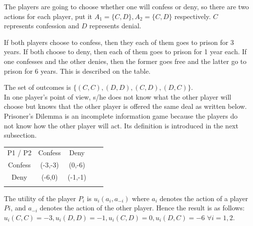 \documentclass[11pt]{article}
\begin{document}
	The players are going to choose whether one will confess or deny, so there are two actions for each player, put it $A_1=\{C,D\}, A_2=\{C,D\}$ respectively. $C$ represents confession and $D$ represents denial.
	
	If both players choose to confess, then they each of them goes to prison for 3 years. If both choose to deny, then each of them goes to prison for 1 year each. If one confesses and the other denies, then the former goes free and the latter go to prison for 6 years. This is described on the table.
	
	The set of outcomes is $\{(C,C), (D,D), (C,D), (D,C)\}$.\\In one player's point of view, s/he does not know what the other player will choose but knows that the other player is offered the same deal as written below. Prisoner's Dilemma is an incomplete information game because the players do not know how the other player will act. Its definition is introduced in the next subsection.

\begin{center}
\begin{tabular}{cccll}
\cline{1-3}
\multicolumn{1}{|c|}{P1 / P2} & \multicolumn{1}{c|}{Confess} & \multicolumn{1}{c|}{Deny}    &  &  \\ \cline{1-3}
\multicolumn{1}{|c|}{Confess} & \multicolumn{1}{c|}{(-3,-3)} & \multicolumn{1}{c|}{(0,-6)}  &  &  \\ \cline{1-3}
\multicolumn{1}{|c|}{Deny}    & \multicolumn{1}{c|}{(-6,0)}  & \multicolumn{1}{c|}{(-1,-1)} &  &  \\ \cline{1-3}
\multicolumn{1}{l}{}          & \multicolumn{1}{l}{}         & \multicolumn{1}{l}{}         &  & 
\end{tabular}
\end{center}
	The utility of the player $P_i$ is $u_i(a_i, a_{-i})$ where $a_i$ denotes the action of a player $Pi$, and $a_{-i}$ denotes the action of the other player. Hence the result is as follows: 
	$u_i(C,C)=-3, u_i(D,D)=-1, u_i(C,D)=0, u_i(D,C)=-6$ $\forall i=1,2$.

\end{document}
